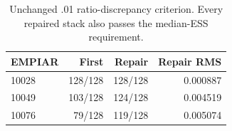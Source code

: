 \begin{table}[t]
\centering\small
\caption{Unchanged .01 ratio-discrepancy criterion. Every repaired stack also passes the median-ESS requirement.}
\label{tab:diag-integration}
\begin{tabular}{lrrr}
\toprule
EMPIAR & First & Repair & Repair RMS\\
\midrule
10028 & 128/128 & 128/128 & 0.000887\\
10049 & 103/128 & 124/128 & 0.004519\\
10076 & 79/128 & 119/128 & 0.005074\\
\bottomrule
\end{tabular}
\end{table}

